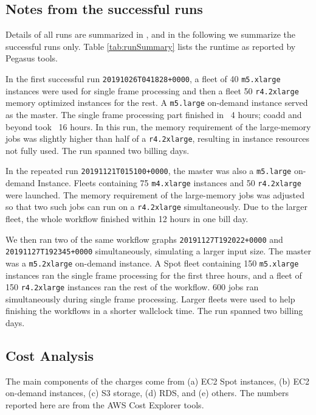 \subsection{Notes from the successful runs}

Details of all runs are summarized in , and in the following we summarize the successful runs only.
Table \ref{tab:runSummary} lists the runtime as reported by Pegasus tools.



In the first successful run \texttt{20191026T041828+0000}, a fleet of 40 \texttt{m5.xlarge} instances were used for single frame processing and then a fleet 50 \texttt{r4.2xlarge} memory optimized instances for the rest.
A \texttt{m5.large} on-demand instance served as the master.
The single frame processing part finished in ~4 hours; coadd and beyond took ~16 hours.
In this run, the memory requirement of the large-memory jobs was slightly higher than half of a \texttt{r4.2xlarge}, resulting in instance resources not fully used.
The run spanned two billing days.

In the repeated run \texttt{20191121T015100+0000}, the master was also a \texttt{m5.large} on-demand Instance.
Fleets containing 75 \texttt{m4.xlarge} instances and 50 \texttt{r4.2xlarge} were launched.
The memory requirement of the large-memory jobs was adjusted so that two such jobs can run on a \texttt{r4.2xlarge} simultaneously.
Due to the larger fleet, the whole workflow finished within 12 hours in one bill day.

We then ran two of the same workflow graphs \texttt{20191127T192022+0000} and \texttt{20191127T192345+0000} simultaneously, simulating a larger input size.
The master was a \texttt{m5.2xlarge} on-demand instance.
A Spot fleet containing 150 \texttt{m5.xlarge} instances ran the single frame processing for the first three hours, and a fleet of 150 \texttt{r4.2xlarge} instances ran the rest of the workflow.
600 jobs ran simultaneously during single frame processing.
Larger fleets were used to help finishing the workflows in a shorter wallclock time.
The run spanned two billing days.

\subsection{Cost Analysis}

The main components of the charges come from (a) EC2 Spot instances, (b) EC2 on-demand instances, (c) S3 storage, (d) RDS, and (e) others.
The numbers reported here are from the AWS Cost Explorer tools.

